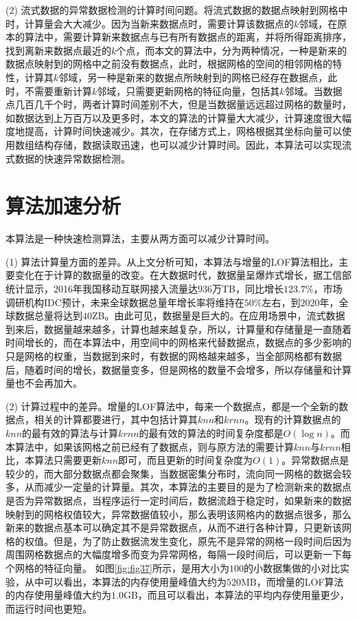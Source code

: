 (2) 流式数据的异常数据检测的计算时间问题。将流式数据的数据点映射到网格中时，计算量会大大减少。因为当新来数据点时，需要计算该数据点的$k$邻域，在原本的算法中，需要计算新来数据点与已有所有数据点的距离，并将所得距离排序，找到离新来数据点最近的$k$个点，而本文的算法中，分为两种情况，一种是新来的数据点映射到的网格中之前没有数据点，此时，根据网格的空间的相邻网格的特性，计算其$k$邻域，另一种是新来的数据点所映射到的网格已经存在数据点，此时，不需要重新计算$k$邻域，只需要更新网格的特征向量，包括其$k$邻域。当数据点几百几千个时，两者计算时间差别不大，但是当数据量远远超过网格的数量时，如数据达到上万百万以及更多时，本文的算法的计算量大大减少，计算速度很大幅度地提高，计算时间快速减少。其次，在存储方式上，网格根据其坐标向量可以使用数组结构存储，数据读取迅速，也可以减少计算时间。因此，本算法可以实现流式数据的快速异常数据检测。

\section{算法加速分析}
本算法是一种快速检测算法，主要从两方面可以减少计算时间。

(1) 算法计算量方面的差异。从上文分析可知，本算法与增量的LOF算法相比，主要变化在于计算的数据量的改变。在大数据时代，数据量呈爆炸式增长，据工信部统计显示，2016年我国移动互联网接入流量达$936$万TB，同比增长$123.7\%$，市场调研机构IDC预计，未来全球数据总量年增长率将维持在$50\%$左右，到$2020$年，全球数据总量将达到$40$ZB。由此可见，数据量是巨大的。在应用场景中，流式数据到来后，数据量越来越多，计算也越来越复杂，所以，计算量和存储量是一直随着时间增长的，而在本算法中，用空间中的网格来代替数据点，数据点的多少影响的只是网格的权重，当数据到来时，有数据的网格越来越多，当全部网格都有数据后，随着时间的增长，数据量变多，但是网格的数量不会增多，所以存储量和计算量也不会再加大。

(2) 计算过程中的差异。增量的LOF算法中，每来一个数据点，都是一个全新的数据点，相关的计算都要进行，其中包括计算其$knn$和$krnn$。现有的计算数据点的$knn$的最有效的算法与计算$krnn$的最有效的算法的时间复杂度都是$O( \log n)$。而本算法中，如果该网格之前已经有了数据点，则与原方法的需要计算$knn$与$krnn$相比，本算法只需要更新$knn$即可，而且更新的时间复杂度为$O(1)$。异常数据点是较少的，而大部分数据点都会聚集，当数据密集分布时，流向同一网格的数据会较多，从而减少一定量的计算量。其次，本算法的主要目的是为了检测新来的数据点是否为异常数据点，当程序运行一定时间后，数据流趋于稳定时，如果新来的数据映射到的网格权值较大，异常数据值较小，那么表明该网格内的数据点很多，那么新来的数据点基本可以确定其不是异常数据点，从而不进行各种计算，只更新该网格的权值。但是，为了防止数据流发生变化，原先不是异常的网格一段时间后因为周围网格数据点的大幅度增多而变为异常网格，每隔一段时间后，可以更新一下每个网格的特征向量。
如图\ref{fig:fig37}所示，是用大小为$100$的小数据集做的小对比实验，从中可以看出，本算法的内存使用量峰值大约为$520$MB，而增量的LOF算法的内存使用量峰值大约为$1.0$GB，而且可以看出，本算法的平均内存使用量更少，而运行时间也更短。

